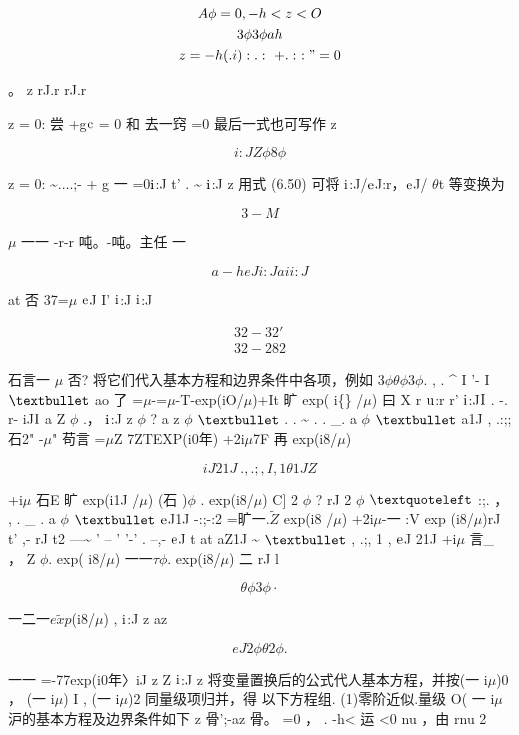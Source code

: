\begin{gather*}
A\phi  =0 ,  -h<z<O\\
3\phi 3\phi  ah\\
z =-h( .i): .:~+.:~ :" = 0
\end{gather*}

。 z rJ.r rJ.r

z = 0: 尝 +g${\rm c}$ = 0 和 去一窍 =0 最后一式也可写作 z

\[i:J Z \phi 8\phi \]

z = 0: \textasciitilde{}....;- + g 一 =0${\rm i}$:J t' . \textasciitilde{} ${\rm i}$:J z 用式 (6.50) 可将 ${\rm i}$:J/${\rm e}$J:r，${\rm e}$J/ $\theta$t 等变换为

\[3-M\]

$\mu$ 一一 -r-r 吨。-吨。主任 一

\[a-h eJ i:J ai i:J\]

at 否 37=$\mu$ ${\rm e}$J I' ${\rm i}$:J ${\rm i}$:J

\begin{gather*}
32-32'\\
32-282
\end{gather*}

石言一 $\mu$ 否? 将它们代入基本方程和边界条件中各项，例如 3$\phi$$\theta$$\phi$3$\phi$. , . \textasciicircum{} I '- I ${\rm •}$ ao 了 =$\mu$-=$\mu$-T-exp(iO/$\mu$)+It 旷 exp( i\{\} /$\mu$) 曰 X r ${\rm u}$:r r' ${\rm i}$:J${\rm I}$ . -. r- iJ${\rm I}$ a Z $\phi$ .， ${\rm i}$:J z $\phi$ ? a z $\phi$ ${\rm •}$ . . \textasciitilde{} . . \_. a $\phi$ ${\rm •}$ a1J , .:;; 石2" -$\mu$" 苟言 =$\mu$Z 7ZTEXP(i0年) +2i$\mu$7F 再 exp(i8/$\mu$)

\[iJ21J ~ . , .;, I ,  1 \theta 1J   Z\]

+i$\mu$ 石E 旷 exp(i1J /$\mu$) (石 )$\phi$ . exp(i8/$\mu$) C] 2 $\phi$ ? rJ 2 $\phi$ ${\rm ‘}$ :;. ， , . \_ . a $\phi$ ${\rm •}$ ${\rm e}$J1J -:;-:2 =旷一.$\tilde{Z}$ exp(i8 /$\mu$) +2i$\mu$-一 :V exp (i8/$\mu$)rJ t' ,- rJ t2 ---\textasciitilde{} ' -- ' '-' . --,- ${\rm e}$J t at aZ1J \textasciitilde{} ${\rm •}$ , .;, 1 , ${\rm e}$J 21J +i$\mu$ 言\_ ， Z $\phi$. exp( i8/$\mu$) 一一$\tau$$\phi$. exp(i8/$\mu$) 二 rJ l

\[\theta \phi 3\phi \cdot \]

一二一$\tilde{exp}$(i8/$\mu$) , ${\rm i}$:J z az

\[eJ 2 \phi \theta 2\phi .\]

一一 =-77exp(i0年〉iJ z Z ${\rm i}$:J z 将变量置换后的公式代人基本方程，并按(一 i$\mu$)0 ， (一 i$\mu$) I , (一 i$\mu$)2 同量级项归并，得 以下方程组. (1)零阶近似.量级 O( 一 i$\mu$ 沪的基本方程及边界条件如下 z 骨';-az 骨。 =0 ， . -h< 运 <0 nu ，由 rnu 2

